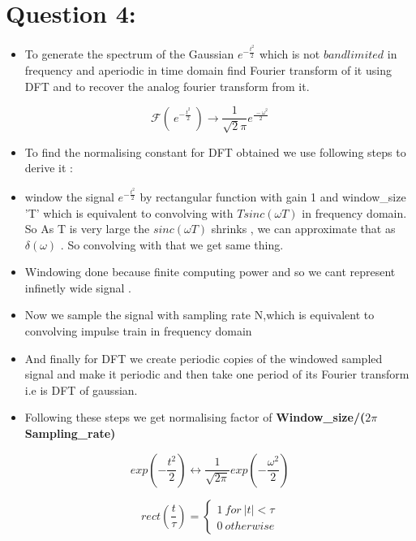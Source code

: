 \documentclass[11pt]{article}
\providecommand{\tightlist}{%
      \setlength{\itemsep}{0pt}\setlength{\parskip}{0pt}}
\begin{document}
    \section{Question 4:}\label{question-4}

\begin{itemize}
\tightlist
\item
  To generate the spectrum of the Gaussian \(e^{-\frac{t^{2}}{ 2}}\)
  which is not \(bandlimited\) in frequency and aperiodic in time domain
  find Fourier transform of it using DFT and to recover the analog
  fourier transform from it.
\end{itemize}

\begin{equation}
 \mathcal{F} ( \ e^{-\frac{t^{2}}{2}} \ ) \to \frac{1}{\sqrt 2\pi} e^{\frac{\ - \omega ^{2}}{2}}
\end{equation}

\begin{itemize}
\tightlist
\item
  To find the normalising constant for DFT obtained we use following
  steps to derive it :
\item
  window the signal \(e^{-\frac{t^{2}}{2}}\) by rectangular function
  with gain 1 and window\_size 'T' which is equivalent to convolving
  with \(Tsinc(\omega T)\) in frequency domain. So As T is very large
  the $sinc(\omega T) $ shrinks , we can approximate that as
  \(\delta(\omega)\) . So convolving with that we get same thing.
\item
  Windowing done because finite computing power and so we cant represent
  infinetly wide signal .
\item
  Now we sample the signal with sampling rate N,which is equivalent to
  convolving impulse train in frequency domain
\item
  And finally for DFT we create periodic copies of the windowed sampled
  signal and make it periodic and then take one period of its Fourier
  transform i.e is DFT of gaussian.
\item
  Following these steps we get normalising factor of
  \textbf{Window\_size/(\(2 \pi \ \)Sampling\_rate)}
\end{itemize}

\begin{equation}
exp({-\frac{t^2}{2}}) \longleftrightarrow \frac{1}{\sqrt{2\pi}}exp({-\frac{\omega^2}{2}})
\end{equation}

\begin{equation}
rect(\frac{t}{\tau}) =
\begin{cases}
1\  for\ |t| < \tau \\
0\ otherwise
\end{cases}
\end{equation}
\end{document}

